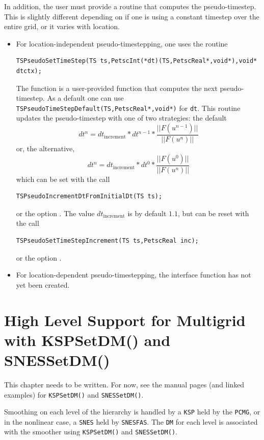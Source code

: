In addition, the user must provide a routine that computes the
pseudo-timestep. This is slightly different depending on if
one is using a constant timestep over the entire grid, or it varies
with location.
\begin{itemize}
\item For location-independent pseudo-timestepping, one uses the routine
\begin{lstlisting}
TSPseudoSetTimeStep(TS ts,PetscInt(*dt)(TS,PetscReal*,void*),void* dtctx);
\end{lstlisting}
The function  is a user-provided function that computes the next
pseudo-timestep. As a default one can use
\lstinline{TSPseudoTimeStepDefault(TS,PetscReal*,void*)} for \lstinline{dt}. This routine
updates the pseudo-timestep with one of two strategies: the default
\[
   dt^{n} = dt_{\mathrm{increment}}*dt^{n-1}*\frac{|| F(u^{n-1}) ||}{|| F(u^{n})||}
\]
or, the alternative,
\[
   dt^{n} = dt_{\mathrm{increment}}*dt^{0}*\frac{|| F(u^{0}) ||}{|| F(u^{n})||}
\]
which can be set with the call
\begin{lstlisting}
TSPseudoIncrementDtFromInitialDt(TS ts);
\end{lstlisting}
or
the option .
The value $ dt_{\mathrm{increment}} $ is by default $ 1.1$, but can be reset with the
call
\begin{lstlisting}
TSPseudoSetTimeStepIncrement(TS ts,PetscReal inc);
\end{lstlisting}
or  the option
. 


\item For location-dependent pseudo-timestepping, the interface function
      has not yet been created.
\end{itemize}

\cleardoublepage
\chapter{High Level Support for Multigrid with KSPSetDM() and SNESSetDM()}
\label{chapter_kspdm}

This chapter needs to be written. For now, see the manual pages (and linked examples) for \lstinline{KSPSetDM()} and \lstinline{SNESSetDM()}.

Smoothing on each level of the hierarchy is handled by a \lstinline{KSP} held by the \lstinline{PCMG}, or in the
nonlinear case, a \lstinline{SNES} held by \lstinline{SNESFAS}. The \lstinline{DM} for each level is associated with the
smoother using \lstinline{KSPSetDM()} and \lstinline{SNESSetDM()}.

